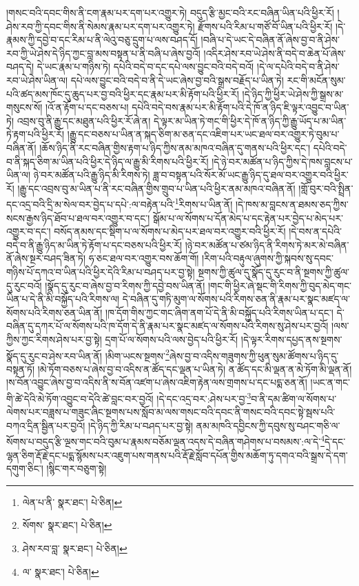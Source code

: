 །གསང་བའི་དབང་གིས་ནི་ངག་རྣམ་པར་དག་པར་འགྱུར་ཏེ། བདུད་རྩི་མྱང་བའི་རང་བཞིན་ཡིན་པའི་ཕྱིར་རོ། །ཤེས་རབ་ཀྱི་དབང་གིས་ནི་སེམས་རྣམ་པར་དག་པར་འགྱུར་ཏེ། རྫོགས་པའི་རིམ་པ་གཙོ་བོ་ཡིན་པའི་ཕྱིར་རོ། །དེ་རྣམས་ཀྱི་དབྱེ་བ་དང་རིམ་པ་ནི་ལེའུ་བཅུ་དྲུག་པ་ལས་བཤད་དོ། །བཞི་པ་དེ་ཡང་དེ་བཞིན་ནོ་ཞེས་བྱ་བ་ནི་ཤེས་རབ་ཀྱི་ཡེ་ཤེས་དེ་ཉིད་ཀྱང་བླ་མས་བསྟན་པ་ནི་བཞི་པ་ཞེས་བྱའོ། །འདིར་ཤེས་རབ་ཡེ་ཤེས་ནི་བདེ་བ་ཆེན་པོ་ཞེས་བཤད་དེ། དེ་ཡང་རྣམ་པ་གཉིས་ཏེ། དཔེའི་བདེ་བ་དང་དཔེ་ལས་བྱུང་བའི་བདེ་བའོ། །དེ་ལ་དཔེའི་བདེ་བ་ནི་ཤེས་རབ་ཡེ་ཤེས་ཡིན་ལ། དཔེ་ལས་བྱུང་བའི་བདེ་བ་ནི་དེ་ཡང་ཞེས་བྱ་བའི་སྒྲས་བརྗོད་པ་ཡིན་ཏེ། རང་གི་མངོན་སུམ་པའི་ཚད་མས་ཁོང་དུ་ཆུད་པར་བྱ་བའི་ཕྱིར་དང་རྣམ་པར་མི་རྟོག་པའི་ཕྱིར་རོ། །དེ་ཉིད་ཀྱི་ཕྱིར་ཡེ་ཤེས་ཀྱི་སྒྲས་མ་གསུངས་སོ། །འོ་ན་རྟོག་པ་དང་བཅས་པ། དཔེའི་བདེ་བས་རྣམ་པར་མི་རྟོག་པའི་དེ་ཁོ་ན་ཉིད་ཇི་ལྟར་འབྱུང་བ་ཡིན་ཏེ། འབྲས་བུ་ནི་རྒྱུ་དང་མཐུན་པའི་ཕྱིར་རོ་ཞེ་ན། དེ་ལྟར་མ་ཡིན་ཏེ་གང་གི་ཕྱིར་དེ་ཁོ་ན་ཉིད་ཀྱི་རྒྱུ་ཡོད་པ་མ་ཡིན་ཏེ་རྟག་པའི་ཕྱིར་རོ། །རྒྱུ་དང་བཅས་པ་ཡིན་ན་སྐད་ཅིག་མ་ཅན་དང་འཇིག་པར་ཡང་ཐལ་བར་འགྱུར་ཏེ་བུམ་པ་བཞིན་ནོ། །ཆོས་ཉིད་ནི་རང་བཞིན་གྱིས་རྟག་པ་ཉིད་ཀྱིས་ནམ་མཁའ་བཞིན་དུ་གནས་པའི་ཕྱིར་དང་། དཔེའི་བདེ་བ་ནི་སྐད་ཅིག་མ་ཡིན་པའི་ཕྱིར་དེ་ཉིད་ལ་རྒྱུ་མི་རིགས་པའི་ཕྱིར་རོ། །དེ་ཉེ་བར་མཚོན་པ་ཉིད་ཀྱིས་དེ་ཁས་བླངས་པ་ཡིན་ལ། ཉེ་བར་མཚོན་པའི་རྒྱུ་ཉིད་མི་རིགས་ཏེ། ཟླ་བ་བསྟན་པའི་སོར་མོ་ཡང་རྒྱུ་ཉིད་དུ་ཐལ་བར་འགྱུར་བའི་ཕྱིར་རོ། །རྒྱུ་དང་འབྲས་བུ་མ་ཡིན་པ་ནི་རང་བཞིན་གྱིས་གྲུབ་པ་ཡིན་པའི་ཕྱིར་ནམ་མཁའ་བཞིན་ནོ། །གློ་བུར་བའི་སྤྲིན་དང་འདྲ་བའི་དྲི་མ་སེལ་བར་བྱེད་པ་དཔེ་:ལ་བརྟེན་པའི་\footnote{ལེན་པ་ནི་  སྣར་ཐང་།  པེ་ཅིན། }རིགས་པ་ཡིན་ནོ། །དེ་ཁས་མ་བླངས་ན་ཐམས་ཅད་ཀྱིས་སངས་རྒྱས་ཉིད་ཐོབ་པ་ཐལ་བར་འགྱུར་བ་དང་། སྒོམ་པ་ལ་སོགས་པ་དོན་མེད་པ་དང་རྟེན་པར་བྱེད་པ་མེད་པར་འགྱུར་བ་དང་། བསོད་ནམས་དང་སྡིག་པ་ལ་སོགས་པ་མེད་པར་ཐལ་བར་འགྱུར་བའི་ཕྱིར་རོ། །དེ་བས་ན་དཔེའི་བདེ་བ་ནི་རྒྱུ་ཉིད་མ་ཡིན་ཏེ་རྟོག་པ་དང་བཅས་པའི་ཕྱིར་རོ། །ཉེ་བར་མཚོན་པ་ཙམ་ཉིད་ནི་རིགས་ཏེ་མར་མེ་བཞིན་ནོ་ཞེས་སྔར་བཤད་ཟིན་ཏེ། ཧ་ཅང་ཐལ་བར་འགྱུར་བས་ཆོག་གོ། །རིག་པའི་བརྟུལ་ཞུགས་ཀྱི་སྐབས་སུ་དབང་གཉིས་པོ་དཀའ་བ་ཡིན་པའི་ཕྱིར་དེའི་རིམ་པ་བཤད་པར་བྱ་སྟེ། སྔགས་ཀྱི་ཚུལ་དུ་སྣོད་དུ་རུང་བ་ནི་སྔགས་ཀྱི་ཚུལ་དུ་རུང་བའོ། །སྣོད་དུ་རུང་བ་ཞེས་བྱ་བ་རིགས་ཀྱི་དབྱེ་བས་ཡིན་ནོ། །གང་གི་ཕྱིར་ཞེ་སྡང་གི་རིགས་ཀྱི་བུད་མེད་གང་ཡིན་པ་དེ་ནི་མི་བསྐྱོད་པའི་རིགས་ལ། དེ་བཞིན་དུ་གཏི་མུག་ལ་སོགས་པའི་རིགས་ཅན་ནི་རྣམ་པར་སྣང་མཛད་ལ་སོགས་པའི་རིགས་ཅན་ཡིན་ནོ། །ཁ་དོག་གིས་ཀྱང་གང་ཞིག་ནག་པོ་དེ་ནི་མི་བསྐྱོད་པའི་རིགས་ཡིན་པ་དང་། དེ་བཞིན་དུ་དཀར་པོ་ལ་སོགས་པའི་ཁ་དོག་དེ་ནི་རྣམ་པར་སྣང་མཛད་ལ་སོགས་པའི་རིགས་སུ་ཤེས་པར་བྱའོ། །ལས་ཀྱིས་ཀྱང་རིགས་ཤེས་པར་བྱ་སྟེ། དྲག་པོ་ལ་སོགས་པའི་ལས་བྱེད་པའི་ཕྱིར་རོ། །དེ་ལྟར་རིགས་དཔྱད་ནས་སྔགས་སྣོད་དུ་རུང་བ་ཤེས་རབ་ཡིན་ནོ། །མིག་ཡངས་སྔགས་\footnote{སོགས་  སྣར་ཐང་།  པེ་ཅིན། }ཞེས་བྱ་བ་འདིས་གཟུགས་ཀྱི་ཕུན་སུམ་ཚོགས་པ་ཉིད་དུ་བསྟན་ཏོ། །མེ་ཏོག་བཅས་པ་ཞེས་བྱ་བ་འདིས་ན་ཚོད་དང་ལྡན་པ་ཡིན་ཏེ། ན་ཚོད་དང་མི་ལྡན་ན་མེ་ཏོག་མི་ལྡན་ནོ། །ས་བོན་འབྱུང་ཞེས་བྱ་བ་འདིས་ནི་ས་བོན་འཛག་པ་ཞེས་འཇིག་རྟེན་ལས་གྲགས་པ་དང་པདྨ་ཅན་ནོ། །ཡང་ན་གང་གི་ཚེ་དེའི་མེ་ཏོག་འབྱུང་བ་དེའི་ཚེ་བླང་བར་བྱའོ། །དེ་དང་འདྲ་བར་:ཤེས་པར་བྱ་\footnote{ཤེས་རབ་བླ་  སྣར་ཐང་།  པེ་ཅིན། }བ་ནི་དམ་ཚིག་ལ་སོགས་པ་ལེགས་པར་བཟླས་པ་གཟུང་ཞིང་སྔགས་པས་སློབ་མ་ལས་གསང་བའི་དབང་ནི་གསང་བའི་དབང་སྟེ་སྦས་པའི་བཀའ་དྲིན་སྦྱིན་པར་བྱའོ། །དེ་ཉིད་ཀྱི་རིམ་པ་བཤད་པར་བྱ་སྟེ། ནམ་མཁའི་དབྱིངས་ཀྱི་དབུས་སུ་བཤང་གཅི་ལ་སོགས་པ་བདུད་རྩི་ལྔས་གང་བའི་བུམ་པ་རྣམས་བཅོམ་ལྡན་འདས་དེ་བཞིན་གཤེགས་པ་བསམས་:ལ་དེ་\footnote{ལ་  སྣར་ཐང་།  པེ་ཅིན། }དེ་དང་ལྷན་ཅིག་རྡོ་རྗེ་དང་པདྨ་སྙོམས་པར་འཇུག་པས་གནས་པའི་རྡོ་རྗེ་སློབ་དཔོན་གྱིས་མཆོག་ཏུ་དགའ་བའི་སྒྲས་དེ་དག་དགུག་ཅིང་། །སྙིང་གར་བཅུག་སྟེ། 